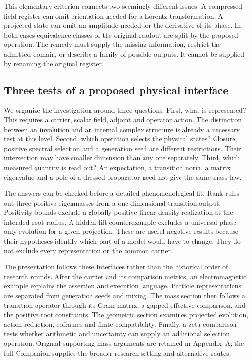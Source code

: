 This elementary criterion connects two seemingly different issues.
A compressed field register can omit orientation needed for a Lorentz
transformation. A projected state can omit an amplitude needed for
the derivative of its phase. In both cases equivalence classes of
the original readout are split by the proposed operation. The remedy
must supply the missing information, restrict the admitted domain,
or describe a family of possible outputs. It cannot be supplied by
renaming the original register.

\subsection{Three tests of a proposed physical interface}

We organize the investigation around three questions. First, what
is represented? This requires a carrier, scalar field, adjoint and
operator action. The distinction between an involution and an internal
complex structure is already a necessary test at this level. Second,
which operation selects the physical states? Closure, positive
spectral selection and a generation seed are different restrictions.
Their intersection may have smaller dimension than any one separately.
Third, which measured quantity is read out? An expectation, a transition
norm, a matrix eigenvalue and a pole of a dressed propagator need not
give the same mass law.

The answers can be checked before a detailed phenomenological fit.
Rank rules out three positive eigenmasses from a one-dimensional
transition output. Positivity bounds exclude a globally positive
linear-density realization at the intended root radius. A hidden-lift
counterexample excludes a universal phase-only evolution for a given
projection. These are useful negative results because their hypotheses
identify which part of a model would have to change. They do not
exclude every representation on the common carrier.

The presentation follows these interfaces rather than the historical
order of research rounds. After the carrier and its comparison metrics,
an electromagnetic example explains the assertion and execution
language. Particle representations are separated from generation
seeds and mixing. The mass section then follows a transition operator
through its Gram matrix, a gapped effective comparison, and the positive
root constraints. The geometric section examines projected evolution,
action reduction, coframes and finite compatibility. Finally, a zeta
comparison tests whether arithmetic and uncertainty can supply an
additional selection operation. Original supporting mass arguments are
retained in Appendix~A; the full Companion \cite{QSC411} supplies the
broader research setting and alternative routes.
